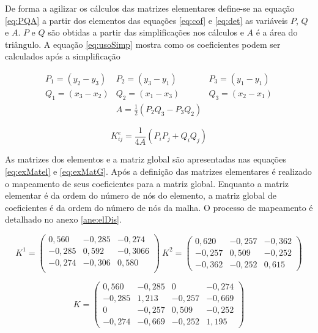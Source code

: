 \documentclass[
    12pt,               %
    openright,          %
    oneside,
    a4paper,            %
    english,            %
    french,             %
    spanish,            %
    brazil              %
    ]{abntex2}
\begin{document}
De forma a agilizar os cálculos das matrizes elementares define-se na equação \ref{eq:PQA}  a partir dos elementos das equações \ref{eq:cof} e \ref{eq:det} as variáveis $P$, $Q$ e $A$. $P$ e $Q$ são obtidas a partir das simplificações nos cálculos e $A$ é a área do triângulo.  A equação \ref{eq:usoSimp} mostra como os coeficientes podem ser calculados após a simplificação

\begin{equation}
\label{eq:PQA}
\begin{matrix}
P_1 = (y_2 - y_3) & P_2 = (y_3 - y_1) & P_3 = (y_1 - y_1) \\
Q_1 = (x_3 - x_2) & Q_2 = (x_1 - x_3) & Q_3 = (x_2 - x_1) \\
\ & A = \frac{1}{2}(P_2Q_3 - P_3Q_2) & \
\end{matrix}
\end{equation}

\begin{equation}
\label{eq:usoSimp}
K^e_{ij} 
= 
\frac{1}{4A}(P_iP_j + Q_iQ_j)
\end{equation}

As matrizes dos elementos e a matriz global são apresentadas nas equações \ref{eq:exMatel} e \ref{eq:exMatG}. Após a definição das matrizes elementares é realizado o mapeamento de seus coeficientes para a matriz global. Enquanto a matriz elementar é da ordem do número de nós do elemento, a matriz global de coeficientes é da ordem do número de nós da malha. O processo de mapeamento é detalhado no anexo \ref{ane:elDis}.

\begin{equation}
\label{eq:exMatel}
K^1 = 
\begin{pmatrix}
0,560 &	-0,285 &	-0,274 \\
-0,285 &	0,592 &	-0,3066\\
-0,274 &	-0,306 &	0,580\\
\end{pmatrix}
\
K^2 =
\begin{pmatrix} 
0,620 &	-0,257 &	-0,362\\
-0,257 &	0,509 &	-0,252\\
-0,362 &	-0,252 &	0,615
\end{pmatrix}
\end{equation}

\begin{equation}
\label{eq:exMatG}
K = 
\begin{pmatrix}
0,560 &	-0,285 &	0&	-0,274\\
-0,285&	1,213&	-0,257&	-0,669\\
0&	-0,257&	0,509&	-0,252\\
-0,274&	-0,669&	-0,252&	1,195
\end{pmatrix}
\end{equation}
\end{document}
